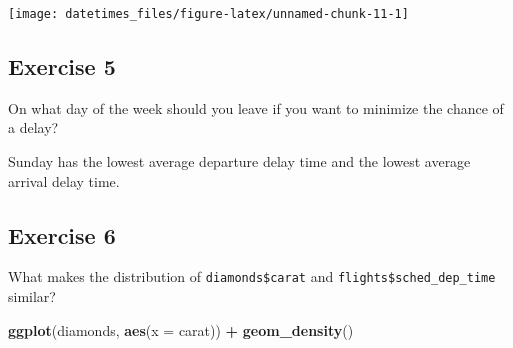 \documentclass[]{book}
\newenvironment{Shaded}{\begin{snugshade}}{\end{snugshade}}
\newcommand{\CommentTok}[1]{\textcolor[rgb]{0.56,0.35,0.01}{\textit{#1}}}
\newcommand{\DataTypeTok}[1]{\textcolor[rgb]{0.13,0.29,0.53}{#1}}
\newcommand{\KeywordTok}[1]{\textcolor[rgb]{0.13,0.29,0.53}{\textbf{#1}}}
\newcommand{\NormalTok}[1]{#1}
\newcommand{\OperatorTok}[1]{\textcolor[rgb]{0.81,0.36,0.00}{\textbf{#1}}}
\newcommand{\OtherTok}[1]{\textcolor[rgb]{0.56,0.35,0.01}{#1}}
\newcommand{\StringTok}[1]{\textcolor[rgb]{0.31,0.60,0.02}{#1}}
\theoremstyle{definition}
\theoremstyle{definition}
\theoremstyle{definition}
\theoremstyle{remark}
\begin{document}
\begin{center}\texttt{[image: datetimes\_files/figure-latex/unnamed-chunk-11-1]} \end{center}

\hypertarget{exercise-5-11}{%
\subsection{Exercise 5}\label{exercise-5-11}}

On what day of the week should you leave if you want to minimize the
chance of a delay?

Sunday has the lowest average departure delay time and the lowest
average arrival delay time.

\begin{Shaded}
\end{Shaded}

\hypertarget{exercise-6-8}{%
\subsection{Exercise 6}\label{exercise-6-8}}

What makes the distribution of \texttt{diamonds\$carat} and
\texttt{flights\$sched\_dep\_time} similar?

\begin{Shaded}
\begin{Highlighting}[]
\KeywordTok{ggplot}\NormalTok{(diamonds, }\KeywordTok{aes}\NormalTok{(}\DataTypeTok{x =}\NormalTok{ carat)) }\OperatorTok{+}\StringTok{ }
\StringTok{  }\KeywordTok{geom_density}\NormalTok{()}
\end{Highlighting}
\end{Shaded}
\end{document}
